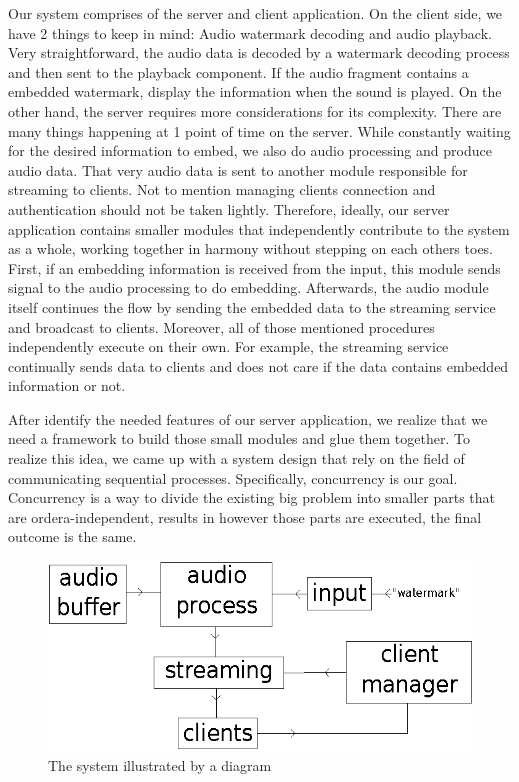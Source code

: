\documentclass[conference]{IEEEtran}
\begin{document}
Our system comprises of the server and client application. On the client side, we have 2 things to keep in mind: Audio watermark decoding and audio playback. Very straightforward, the audio data is decoded by a watermark decoding process and then sent to the playback component. If the audio fragment contains a embedded watermark, display the information when the sound is played. On the other hand, the server requires more considerations for its complexity. There are many things happening at 1 point of time on the server. While constantly waiting for the desired information to embed, we also do audio processing and produce audio data. That very audio data is sent to another module responsible for streaming to clients. Not to mention managing clients connection and authentication should not be taken lightly. Therefore, ideally, our server application contains smaller modules that independently contribute to the system as a whole, working together in harmony without stepping on each others toes. First, if an embedding information is received from the input, this module sends signal to the audio processing to do embedding. Afterwards, the audio module itself continues the flow by sending the embedded data to the streaming service and broadcast to clients. Moreover, all of those mentioned procedures independently execute on their own. For example, the streaming service continually sends data to clients and does not care if the data contains embedded information or not. 

After identify the needed features of our server application, we realize that we need a framework to build those small modules and glue them together. To realize this idea, we came up with a system design that rely on the field of communicating sequential processes. Specifically, concurrency is our goal. Concurrency is a way to divide the existing big problem into smaller parts that are ordera-independent, results in however those parts are executed, the final outcome is the same.

\begin{figure}
  \includegraphics{drawing.eps}
  \caption{The system illustrated by a diagram}

\end{figure}
\end{document}
